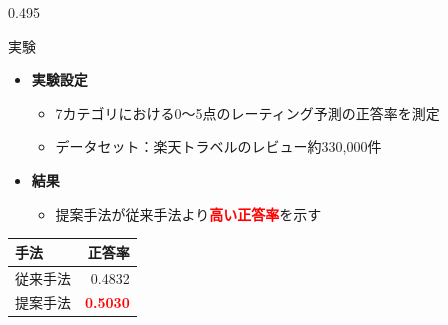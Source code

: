 \documentclass[unicode,10pt]{beamer}
\newcommand{\columnsize}{0.495\textwidth}
\newcommand{\itemtitle}[1]{\textbf{#1}\\}
\newcommand{\fire}[1]{\textcolor{red}{\textbf{#1}}}
\begin{document}
\begin{frame}
\begin{columns}[onlytextwidth,t]
\begin{column}{\columnsize}
  \begin{block}{実験}
    \begin{itemize}
      \item \itemtitle{実験設定}
        \begin{itemize}
          \item 7カテゴリにおける0〜5点のレーティング予測の正答率を測定
          \item データセット：楽天トラベルのレビュー約330,000件
        \end{itemize}
    \end{itemize}

    \begin{multicols}{2}
      \begin{itemize}
        \item \itemtitle{結果}
          \begin{itemize}
            \item 提案手法が従来手法より\fire{高い正答率}を示す
          \end{itemize}
      \end{itemize}
      \columnbreak
      \begin{table}
        \centering
        \begin{tabular}{l | r}
          手法 & 正答率 \\
          \hline
          従来手法\cite{fujitani15} & 0.4832 \\
          提案手法 & \fire{0.5030} \\
        \end{tabular}
      \end{table}
    \end{multicols}
  \end{block}


\end{column}
\end{columns}
\end{frame}
\end{document}
